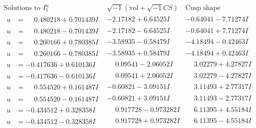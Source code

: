 \documentclass[1p]{elsarticle_modified}
\theoremstyle{definition}
\newcommand{\I}{\sqrt{-1}}
\begin{document}
$$\begin{array}{c|c|c}  
\text{Solutions to }I^u_{1}& \I (\text{vol} + \sqrt{-1}CS) & \text{Cusp shape}\\
 \hline 
\begin{aligned}
u &= \phantom{-}0.480218 + 0.701439 I\end{aligned}
 & -2.17182 + 6.64525 I & -0.64041 - 7.71274 I \\ \hline\begin{aligned}
u &= \phantom{-}0.480218 - 0.701439 I\end{aligned}
 & -2.17182 - 6.64525 I & -0.64041 + 7.71274 I \\ \hline\begin{aligned}
u &= \phantom{-}0.260166 + 0.780385 I\end{aligned}
 & -3.58935 - 0.58479 I & -4.18494 - 0.42463 I \\ \hline\begin{aligned}
u &= \phantom{-}0.260166 - 0.780385 I\end{aligned}
 & -3.58935 + 0.58479 I & -4.18494 + 0.42463 I \\ \hline\begin{aligned}
u &= -0.417636 + 0.610136 I\end{aligned}
 & \phantom{-}0.09541 - 2.06052 I & \phantom{-}3.02279 + 4.27827 I \\ \hline\begin{aligned}
u &= -0.417636 - 0.610136 I\end{aligned}
 & \phantom{-}0.09541 + 2.06052 I & \phantom{-}3.02279 - 4.27827 I \\ \hline\begin{aligned}
u &= \phantom{-}0.554520 + 0.161487 I\end{aligned}
 & -0.60821 - 3.09151 I & \phantom{-}3.11493 + 2.77317 I \\ \hline\begin{aligned}
u &= \phantom{-}0.554520 - 0.161487 I\end{aligned}
 & -0.60821 + 3.09151 I & \phantom{-}3.11493 - 2.77317 I \\ \hline\begin{aligned}
u &= -0.434512 + 0.328358 I\end{aligned}
 & \phantom{-}0.917728 - 0.973282 I & \phantom{-}6.11395 + 4.55184 I \\ \hline\begin{aligned}
u &= -0.434512 - 0.328358 I\end{aligned}
 & \phantom{-}0.917728 + 0.973282 I & \phantom{-}6.11395 - 4.55184 I \\ \hline\begin{aligned}

\end{aligned}
\end{array}$$
\end{document}
